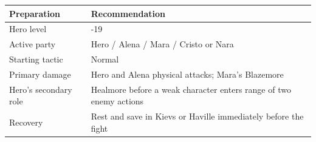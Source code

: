 \documentclass[
  american,
  10pt,
  letterpaper,
  oneside,
  open=any]{scrreprt}
\newcounter{none} %
\newenvironment{guidetable}{%
  \small\setstretch{1.0}%
  \setlength{\tabcolsep}{4pt}%
  \setlength{\LTpre}{8pt}\setlength{\LTpost}{10pt}%
  \renewcommand{\arraystretch}{1.16}%
}{ }
\begin{document}
\begin{guidetable}

{\def\LTcaptype{none} %
\begin{longtable}[]{@{}
  >{\raggedright\arraybackslash}p{}
  >{\raggedright\arraybackslash}p{}@{}}
\toprule\noalign{}
\begin{minipage}[b]{\linewidth}\raggedright
\color{GuideGreen}\bfseries Preparation
\end{minipage} & \begin{minipage}[b]{\linewidth}\raggedright
\color{GuideGreen}\bfseries Recommendation
\end{minipage} \\
\midrule\noalign{}
\endhead
\bottomrule\noalign{}
\endlastfoot
Hero level & 18-19 \\
Active party & Hero / Alena / Mara / Cristo or Nara \\
Starting tactic & Normal \\
Primary damage & Hero and Alena physical attacks; Mara's Blazemore \\
Hero's secondary role & Healmore before a weak character enters range of
two enemy actions \\
Recovery & Rest and save in Kievs or Haville immediately before the
fight \\
\end{longtable}
}

\end{guidetable}
\end{document}
